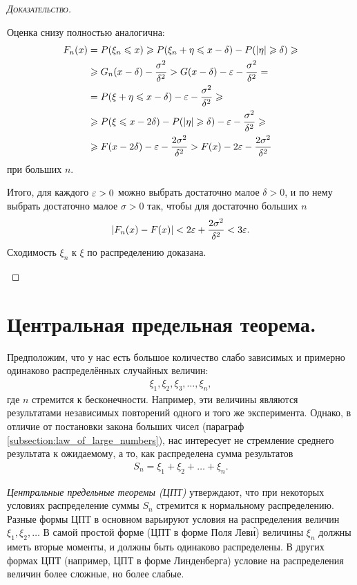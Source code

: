 \documentclass[../main.tex]{subfiles}
\begin{document}
\begin{proof}[\normalfont\textsc{Доказательство}]
\begin{itemize}
   Оценка снизу полностью аналогична:
   \begin{align*}
    F_n(x) &= P(\xi_n \leqslant x) \geqslant P(\xi_n + \eta \leqslant x - \delta) - P(\left| \eta \right| \geqslant \delta) \geqslant \\
    &\geqslant G_n(x-\delta) - \frac{\sigma^{2}}{\delta^{2}} > G(x-\delta)-\varepsilon-\frac{\sigma^{2}}{\delta^{2}} = \\
    &= P(\xi+\eta \leqslant x - \delta)-\varepsilon-\frac{\sigma^{2}}{\delta^{2}} \geqslant \\
    &\geqslant P(\xi \leqslant x - 2\delta) - P(\left| \eta \right| \geqslant \delta) - \varepsilon - \frac{\sigma^{2}}{\delta^{2}} \geqslant \\
    &\geqslant F(x-2\delta) - \varepsilon - \frac{2\sigma^{2}}{\delta^{2}} > F(x) - 2\varepsilon - \frac{2\sigma^{2}}{\delta^{2}}
   \end{align*} при больших $ n $.

   Итого, для каждого $ \varepsilon > 0 $ можно выбрать достаточно малое $ \delta > 0 $, и по нему выбрать достаточно малое $ \sigma > 0 $  так, чтобы для достаточно больших $ n $ 
   \begin{align*}
    \left| F_n(x)-F(x) \right| < 2\varepsilon + \frac{2\sigma^{2}}{\delta^{2}} < 3\varepsilon.
   \end{align*} Сходимость $ \xi_n $ к $ \xi $ по распределению доказана.
 \end{itemize}
\end{proof}

\newpage
\section{Центральная предельная теорема.}

Предположим, что у нас есть большое количество слабо зависимых и примерно одинаково распределённых случайных величин:
\begin{align*}
 \xi_1, \xi_2, \xi_3, \ldots, \xi_n,
\end{align*} где $ n $ стремится к бесконечности. Например, эти величины являются результатами независимых повторений одного и того же эксперимента. Однако, в отличие от постановки закона больших чисел (параграф \ref{subsection:law_of_large_numbers}), нас интересует не стремление среднего результата к ожидаемому, а то, как распределена сумма результатов
\begin{align*}
 S_n = \xi_1 + \xi_2 + \ldots + \xi_n.
\end{align*}

\textit{Центральные предельные теоремы (ЦПТ)} утверждают, что при некоторых условиях распределение суммы $ S_n $ стремится к нормальному распределению. Разные формы ЦПТ в основном варьируют условия на распределения величин $ \xi_1, \xi_2, \ldots $ В самой простой форме (ЦПТ в форме Поля Лев\'{и}) величины $ \xi_n $ должны иметь вторые моменты, и должны быть одинаково распределены. В других формах ЦПТ (например, ЦПТ в форме Линденберга) условие на распределения величин более сложные, но более слабые.
\end{document}
